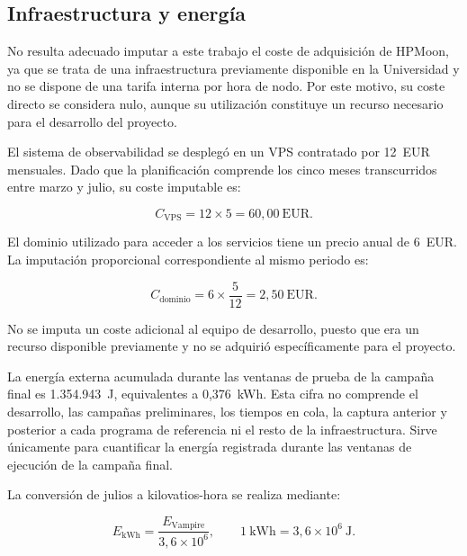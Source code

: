 \subsection{Infraestructura y energía}

No resulta adecuado imputar a este trabajo el coste de adquisición de HPMoon, ya que se trata de una infraestructura previamente disponible en la Universidad y no se dispone de una tarifa interna por hora de nodo. Por este motivo, su coste directo se considera nulo, aunque su utilización constituye un recurso necesario para el desarrollo del proyecto.

El sistema de observabilidad se desplegó en un VPS contratado por 12~EUR mensuales. Dado que la planificación comprende los cinco meses transcurridos entre marzo y julio, su coste imputable es:

\begin{equation}
    C_{\mathrm{VPS}} =
    12 \times 5 =
    60{,}00~\mathrm{EUR}.
    \label{eq:coste-vps}
\end{equation}

El dominio utilizado para acceder a los servicios tiene un precio anual de 6~EUR. La imputación proporcional correspondiente al mismo periodo es:

\begin{equation}
    C_{\mathrm{dominio}} =
    6 \times \frac{5}{12} =
    2{,}50~\mathrm{EUR}.
    \label{eq:coste-dominio}
\end{equation}

No se imputa un coste adicional al equipo de desarrollo, puesto que era un recurso disponible previamente y no se adquirió específicamente para el proyecto.

La energía externa acumulada durante las ventanas de prueba de la campaña final es 1.354.943~J, equivalentes a 0,376~kWh. Esta cifra no comprende el desarrollo, las campañas preliminares, los tiempos en cola, la captura anterior y posterior a cada programa de referencia ni el resto de la infraestructura. Sirve únicamente para cuantificar la energía registrada durante las ventanas de ejecución de la campaña final.

La conversión de julios a kilovatios-hora se realiza mediante:

\begin{equation}
    E_{\mathrm{kWh}} =
    \frac{E_{\mathrm{Vampire}}}{3{,}6\times10^6},
    \qquad
    1~\mathrm{kWh}=3{,}6\times10^6~\mathrm{J}.
    \label{eq:conversion-energia}
\end{equation}

